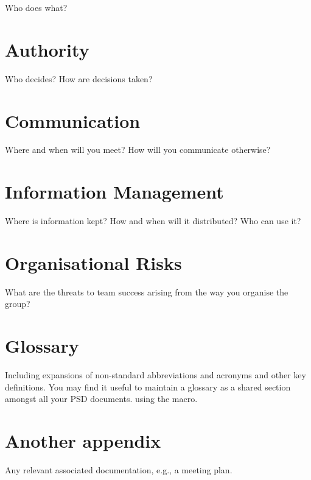 \documentclass{l3deliverable}
\begin{document}
 Who does what?


\section{Authority}

Who decides?  How are decisions taken?


\section{Communication}

Where and when will you meet?  How will you communicate otherwise?


\section{Information Management}

Where is information kept?  How and when will it distributed?  Who can
use it?


\section{Organisational Risks}

What are the threats to team success arising from the way you organise
the group?


\appendix

\section{Glossary}

Including expansions of non-standard abbreviations and acronyms and
other key definitions.  You may find it useful to maintain a glossary
as a shared section amongst all your PSD documents. using the
\verb!! macro.

\section{Another appendix}

Any relevant associated documentation, e.g., a meeting plan.
\end{document}
